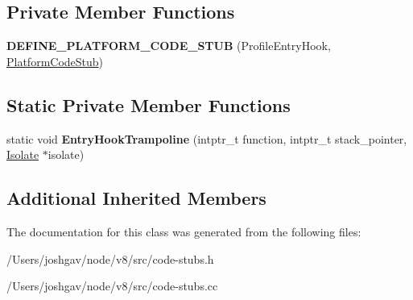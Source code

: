\subsection*{Private Member Functions}
\begin{DoxyCompactItemize}
\item 
{\bfseries D\+E\+F\+I\+N\+E\+\_\+\+P\+L\+A\+T\+F\+O\+R\+M\+\_\+\+C\+O\+D\+E\+\_\+\+S\+T\+UB} (Profile\+Entry\+Hook, \hyperlink{classv8_1_1internal_1_1_platform_code_stub}{Platform\+Code\+Stub})\hypertarget{classv8_1_1internal_1_1_profile_entry_hook_stub_a3da127c1afe0e5da9239097d296cad80}{}\label{classv8_1_1internal_1_1_profile_entry_hook_stub_a3da127c1afe0e5da9239097d296cad80}

\end{DoxyCompactItemize}
\subsection*{Static Private Member Functions}
\begin{DoxyCompactItemize}
\item 
static void {\bfseries Entry\+Hook\+Trampoline} (intptr\+\_\+t function, intptr\+\_\+t stack\+\_\+pointer, \hyperlink{classv8_1_1internal_1_1_isolate}{Isolate} $\ast$isolate)\hypertarget{classv8_1_1internal_1_1_profile_entry_hook_stub_aa3669fd92c385082136c5174f4884934}{}\label{classv8_1_1internal_1_1_profile_entry_hook_stub_aa3669fd92c385082136c5174f4884934}

\end{DoxyCompactItemize}
\subsection*{Additional Inherited Members}


The documentation for this class was generated from the following files\+:\begin{DoxyCompactItemize}
\item 
/\+Users/joshgav/node/v8/src/code-\/stubs.\+h\item 
/\+Users/joshgav/node/v8/src/code-\/stubs.\+cc\end{DoxyCompactItemize}
